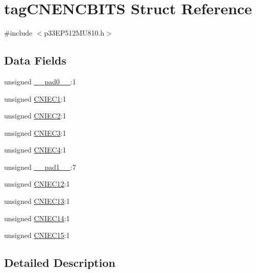 \hypertarget{structtag_c_n_e_n_c_b_i_t_s}{}\section{tag\+C\+N\+E\+N\+C\+B\+I\+TS Struct Reference}
\label{structtag_c_n_e_n_c_b_i_t_s}


{\ttfamily \#include $<$p33\+E\+P512\+M\+U810.\+h$>$}

\subsection*{Data Fields}
\begin{DoxyCompactItemize}
\item 
unsigned \hyperlink{structtag_c_n_e_n_c_b_i_t_s_adf71f3d8410c1f1dbbc96680a92c49af}{\+\_\+\+\_\+pad0\+\_\+\+\_\+}\+:1
\item 
unsigned \hyperlink{structtag_c_n_e_n_c_b_i_t_s_a6d5f87b90189742c754e903722583712}{C\+N\+I\+E\+C1}\+:1
\item 
unsigned \hyperlink{structtag_c_n_e_n_c_b_i_t_s_a0ce8824bc98a3c31c52f73ab1f388089}{C\+N\+I\+E\+C2}\+:1
\item 
unsigned \hyperlink{structtag_c_n_e_n_c_b_i_t_s_a38961348ba79919e75ad4697bb53da7b}{C\+N\+I\+E\+C3}\+:1
\item 
unsigned \hyperlink{structtag_c_n_e_n_c_b_i_t_s_aed4ab0487a7149fde00f52e69f42dff5}{C\+N\+I\+E\+C4}\+:1
\item 
unsigned \hyperlink{structtag_c_n_e_n_c_b_i_t_s_acaf2d0924a107ec6e8d2e31febaf66f9}{\+\_\+\+\_\+pad1\+\_\+\+\_\+}\+:7
\item 
unsigned \hyperlink{structtag_c_n_e_n_c_b_i_t_s_a620805723db3cdd8656b96be18674d15}{C\+N\+I\+E\+C12}\+:1
\item 
unsigned \hyperlink{structtag_c_n_e_n_c_b_i_t_s_a2772808b92cdf16d835b1da547d965e2}{C\+N\+I\+E\+C13}\+:1
\item 
unsigned \hyperlink{structtag_c_n_e_n_c_b_i_t_s_a1c0c940a8c0af97d17b6042a16de5378}{C\+N\+I\+E\+C14}\+:1
\item 
unsigned \hyperlink{structtag_c_n_e_n_c_b_i_t_s_aa2ccb0b2c3c9c4ab0fa9d3ebf7a33e75}{C\+N\+I\+E\+C15}\+:1
\end{DoxyCompactItemize}


\subsection{Detailed Description}


